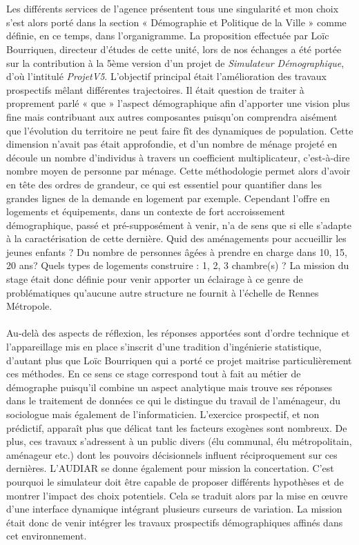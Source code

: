 \documentclass{bredele}
\begin{document}
\\\\
Les différents services de l’agence présentent tous une singularité et mon choix s’est alors porté dans la section « Démographie et Politique de la Ville » comme définie, en ce temps, dans l’organigramme. La proposition effectuée par Loïc Bourriquen, directeur d’études de cette unité, lors de nos échanges a été portée sur la contribution à la 5ème version d’un projet de \textit{Simulateur Démographique}, d’où l’intitulé \textit{ProjetV5}. L’objectif principal était l'amélioration des travaux prospectifs mêlant différentes trajectoires. Il était question de traiter à proprement parlé « que » l’aspect démographique afin d’apporter une vision plus fine mais contribuant aux autres composantes puisqu’on comprendra aisément que l’évolution du territoire ne peut faire fît des dynamiques de population. Cette dimension n’avait pas était approfondie, et d’un nombre de ménage projeté en découle un nombre d’individus à travers un coefficient multiplicateur, c'est-à-dire nombre moyen de personne par ménage. Cette méthodologie permet alors d’avoir en tête des ordres de grandeur, ce qui est essentiel pour quantifier dans les grandes lignes de la demande en logement par exemple. Cependant l’offre en logements et équipements, dans un contexte de fort accroissement démographique, passé et pré-supposément à venir,  n’a de sens que si elle s’adapte à la caractérisation  de cette dernière. Quid des aménagements pour accueillir les jeunes enfants ? Du nombre de personnes âgées à prendre en charge dans 10, 15, 20 ans? Quels types de logements construire : 1, 2, 3 chambre(s) ? La mission du stage était donc définie pour venir apporter un éclairage à ce genre  de problématiques qu’aucune autre structure ne fournit à l’échelle de Rennes Métropole.
\\\\
Au-delà des aspects de réflexion, les réponses apportées sont d’ordre technique et l’appareillage mis en place s’inscrit d’une tradition d’ingénierie statistique, d’autant plus que Loïc Bourriquen qui a porté ce projet maitrise particulièrement ces méthodes. En ce sens ce stage correspond tout à fait au métier de démographe puisqu’il combine un aspect analytique mais trouve ses réponses dans le traitement de données ce qui le distingue du travail de l’aménageur, du sociologue mais également de l’informaticien. L’exercice prospectif, et non prédictif, apparaît plus que délicat tant les facteurs exogènes sont nombreux. De plus, ces travaux s’adressent à un public divers (élu communal, élu métropolitain, aménageur etc.) dont les pouvoirs décisionnels influent réciproquement sur ces dernières. L’AUDIAR se donne également pour mission la concertation. C’est pourquoi le simulateur doit être capable de proposer différents hypothèses et de montrer l’impact des choix potentiels. Cela se traduit alors par la mise en œuvre d'une interface dynamique intégrant plusieurs curseurs de variation. La mission était donc de venir intégrer les travaux prospectifs démographiques affinés dans cet environnement.
\end{document}
